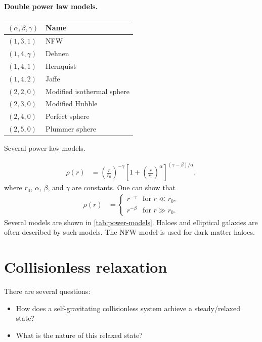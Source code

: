 \paragraph*{Double power law models.}
\begin{margintable}
	\footnotesize
	\begin{tabular}{ll}
		\toprule
		$(\alpha, \beta, \gamma)$ & Name\\
		\midrule
		$(1,3,1)$ & NFW\\
		$(1,4,\gamma)$ & Dehnen\\
		$(1,4,1)$ & Hernquist\\
		$(1,4,2)$ & Jaffe\\
		$(2,2,0)$ & Modified isothermal sphere\\
		$(2,3,0)$ & Modified Hubble\\
		$(2,4,0)$ & Perfect sphere\\
		$(2,5,0)$ & Plummer sphere\\
		\bottomrule
	\end{tabular}
	\caption{Several power law models.}
	\label{tab:power-models}
\end{margintable}
\begin{align*}
	\rho(r)
	&= \left( \frac{r}{r_0} \right)^{-\gamma}
	\left[ 1 + \left(\frac{r}{r_0}  \right)^\alpha \right]^{(\gamma-\beta)/\alpha},
\end{align*}
where $r_0$, $\alpha$, $\beta$, and $\gamma$ are constants.
One can show that
\begin{align*}
	\rho(r)
	&=
	\begin{cases}
		r^{ - \gamma} & \text{for } r \ll r_0,\\
		r^{ - \beta} & \text{for } r \gg r_0.
	\end{cases}
\end{align*}
Several models are shown in \cref{tab:power-models}.
Haloes and elliptical galaxies are often described by such models.
The NFW model is used for dark matter haloes.














\section{Collisionless relaxation}
There are several questions:
\begin{itemize}
	\item How does a self-gravitating collisionless system achieve a steady/relaxed state?
	\item What is the nature of this relaxed state?
\end{itemize}

